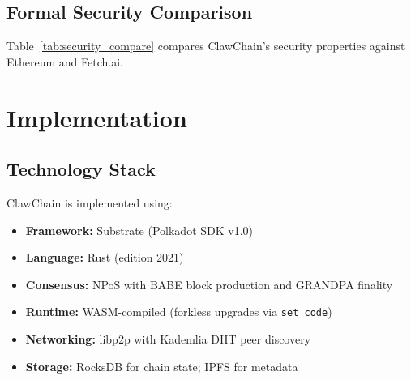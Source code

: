 \documentclass[conference]{IEEEtran}
\begin{document}
\subsection{Formal Security Comparison}

Table~\ref{tab:security_compare} compares ClawChain's security properties against Ethereum and Fetch.ai.

\begin{table}[t]
\centering
\small
{}
\caption{Formal security properties. ``$\sqrt{k}$ bound'' means Sybil advantage is $O(\sqrt{k})$.}
\label{tab:security_compare}
\end{table}


\section{Implementation}\label{sec:implementation}

\subsection{Technology Stack}

ClawChain is implemented using:
\begin{itemize}
    \item \textbf{Framework:} Substrate (Polkadot SDK v1.0)~\cite{parity_substrate}
    \item \textbf{Language:} Rust (edition 2021)
    \item \textbf{Consensus:} NPoS with BABE block production and GRANDPA finality
    \item \textbf{Runtime:} WASM-compiled (forkless upgrades via \texttt{set\_code})
    \item \textbf{Networking:} libp2p with Kademlia DHT peer discovery
    \item \textbf{Storage:} RocksDB for chain state; IPFS for metadata
\end{itemize}
\end{document}
